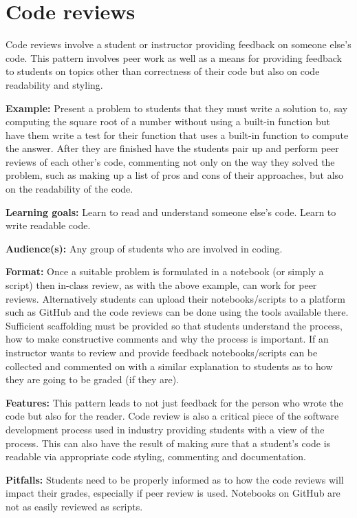 \documentclass[]{book}
\begin{document}
\section{Code reviews}\label{code-reviews}

Code reviews involve a student or instructor providing feedback on
someone else's code. This pattern involves peer work as well as a means
for providing feedback to students on topics other than correctness of
their code but also on code readability and styling.

\textbf{Example:} Present a problem to students that they must write a
solution to, say computing the square root of a number without using a
built-in function but have them write a test for their function that
uses a built-in function to compute the answer. After they are finished
have the students pair up and perform peer reviews of each other's code,
commenting not only on the way they solved the problem, such as making
up a list of pros and cons of their approaches, but also on the
readability of the code.

\textbf{Learning goals:} Learn to read and understand someone else's
code. Learn to write readable code.

\textbf{Audience(s):} Any group of students who are involved in coding.

\textbf{Format:} Once a suitable problem is formulated in a notebook (or
simply a script) then in-class review, as with the above example, can
work for peer reviews. Alternatively students can upload their
notebooks/scripts to a platform such as GitHub and the code reviews can
be done using the tools available there. Sufficient scaffolding must be
provided so that students understand the process, how to make
constructive comments and why the process is important. If an instructor
wants to review and provide feedback notebooks/scripts can be collected
and commented on with a similar explanation to students as to how they
are going to be graded (if they are).

\textbf{Features:} This pattern leads to not just feedback for the
person who wrote the code but also for the reader. Code review is also a
critical piece of the software development process used in industry
providing students with a view of the process. This can also have the
result of making sure that a student's code is readable via appropriate
code styling, commenting and documentation.

\textbf{Pitfalls:} Students need to be properly informed as to how the
code reviews will impact their grades, especially if peer review is
used. Notebooks on GitHub are not as easily reviewed as scripts.
\end{document}
